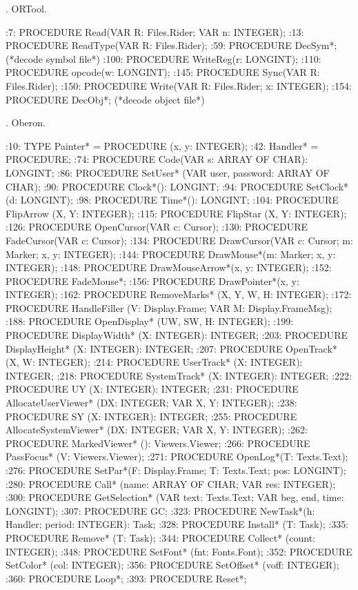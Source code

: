 . ORTool.

:7:  PROCEDURE Read(VAR R: Files.Rider; VAR n: INTEGER);
:13:  PROCEDURE ReadType(VAR R: Files.Rider);
:59:  PROCEDURE DecSym*;  (*decode symbol file*)
:100:  PROCEDURE WriteReg(r: LONGINT);
:110:  PROCEDURE opcode(w: LONGINT);
:145:  PROCEDURE Sync(VAR R: Files.Rider);
:150:  PROCEDURE Write(VAR R: Files.Rider; x: INTEGER);
:154:  PROCEDURE DecObj*;   (*decode object file*)

. Oberon.

:10:  TYPE Painter* = PROCEDURE (x, y: INTEGER);
:42:    Handler* = PROCEDURE;
:74:  PROCEDURE Code(VAR s: ARRAY OF CHAR): LONGINT;
:86:  PROCEDURE SetUser* (VAR user, password: ARRAY OF CHAR);
:90:  PROCEDURE Clock*(): LONGINT;
:94:  PROCEDURE SetClock* (d: LONGINT);
:98:  PROCEDURE Time*(): LONGINT;
:104:  PROCEDURE FlipArrow (X, Y: INTEGER);
:115:  PROCEDURE FlipStar (X, Y: INTEGER);
:126:  PROCEDURE OpenCursor(VAR c: Cursor);
:130:  PROCEDURE FadeCursor(VAR c: Cursor);
:134:  PROCEDURE DrawCursor(VAR c: Cursor; m: Marker; x, y: INTEGER);
:144:  PROCEDURE DrawMouse*(m: Marker; x, y: INTEGER);
:148:  PROCEDURE DrawMouseArrow*(x, y: INTEGER);
:152:  PROCEDURE FadeMouse*;
:156:  PROCEDURE DrawPointer*(x, y: INTEGER);
:162:  PROCEDURE RemoveMarks* (X, Y, W, H: INTEGER);
:172:  PROCEDURE HandleFiller (V: Display.Frame; VAR M: Display.FrameMsg);
:188:  PROCEDURE OpenDisplay* (UW, SW, H: INTEGER);
:199:  PROCEDURE DisplayWidth* (X: INTEGER): INTEGER;
:203:  PROCEDURE DisplayHeight* (X: INTEGER): INTEGER;
:207:  PROCEDURE OpenTrack* (X, W: INTEGER);
:214:  PROCEDURE UserTrack* (X: INTEGER): INTEGER;
:218:  PROCEDURE SystemTrack* (X: INTEGER): INTEGER;
:222:  PROCEDURE UY (X: INTEGER): INTEGER;
:231:  PROCEDURE AllocateUserViewer* (DX: INTEGER; VAR X, Y: INTEGER);
:238:  PROCEDURE SY (X: INTEGER): INTEGER;
:255:  PROCEDURE AllocateSystemViewer* (DX: INTEGER; VAR X, Y: INTEGER);
:262:  PROCEDURE MarkedViewer* (): Viewers.Viewer;
:266:  PROCEDURE PassFocus* (V: Viewers.Viewer);
:271:  PROCEDURE OpenLog*(T: Texts.Text);
:276:  PROCEDURE SetPar*(F: Display.Frame; T: Texts.Text; pos: LONGINT);
:280:  PROCEDURE Call* (name: ARRAY OF CHAR; VAR res: INTEGER);
:300:  PROCEDURE GetSelection* (VAR text: Texts.Text; VAR beg, end, time: LONGINT);
:307:  PROCEDURE GC;
:323:  PROCEDURE NewTask*(h: Handler; period: INTEGER): Task;
:328:  PROCEDURE Install* (T: Task);
:335:  PROCEDURE Remove* (T: Task);
:344:  PROCEDURE Collect* (count: INTEGER);
:348:  PROCEDURE SetFont* (fnt: Fonts.Font);
:352:  PROCEDURE SetColor* (col: INTEGER);
:356:  PROCEDURE SetOffset* (voff: INTEGER);
:360:  PROCEDURE Loop*;
:393:  PROCEDURE Reset*;

